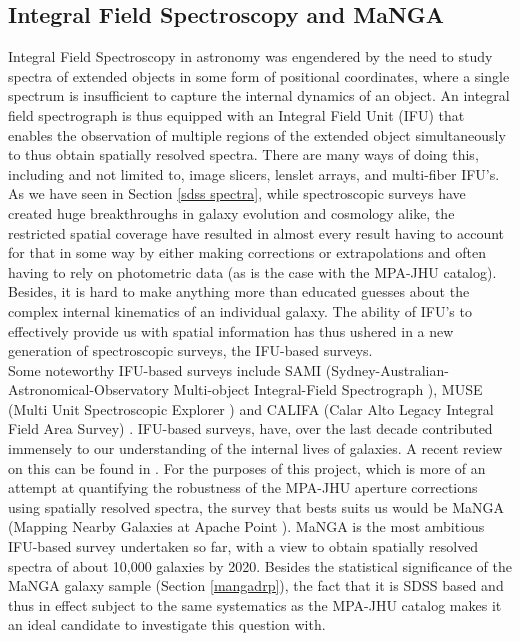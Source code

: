\subsection{Integral Field Spectroscopy and MaNGA}

Integral Field Spectroscopy in astronomy was engendered by the need to study spectra of extended objects in some form of positional coordinates, where a single spectrum is insufficient to capture the internal dynamics of an object. An integral field spectrograph is thus equipped with an Integral Field Unit (IFU) that enables the observation of multiple regions of the extended object simultaneously to thus obtain spatially resolved spectra. There are many ways of doing this, including and not limited to, image slicers, lenslet arrays, and multi-fiber IFU's. As we have seen in Section \ref{sdss spectra}, while spectroscopic surveys have created huge breakthroughs in galaxy evolution and cosmology alike, the restricted spatial coverage have resulted in almost every result having to account for that in some way by either making corrections or extrapolations and often having to rely on photometric data (as is the case with the MPA-JHU catalog). Besides, it is hard to make anything more than educated guesses about the complex internal kinematics of an individual galaxy. The ability of IFU's to effectively provide us with spatial information has thus ushered in a new generation of spectroscopic surveys, the IFU-based surveys.\\

Some noteworthy IFU-based surveys include SAMI (Sydney-Australian-Astronomical-Observatory Multi-object Integral-Field Spectrograph \citep{bryant_sami_2015, yan2016}), MUSE (Multi Unit Spectroscopic Explorer \citep{bacon_muse_2015}) and CALIFA (Calar Alto Legacy Integral Field Area Survey) \citep{sanchez_califa_2012}. IFU-based surveys, have, over the last decade contributed immensely to our understanding of the internal lives of galaxies. A recent review on this can be found in \citet{Cappellari2016}. For the purposes of this project, which is more of an attempt at quantifying the robustness of the MPA-JHU aperture corrections using spatially resolved spectra, the survey that bests suits us would be MaNGA (Mapping Nearby Galaxies at Apache Point \citep{bundy_overview_2014}). MaNGA is the most ambitious IFU-based survey undertaken so far, with a view to obtain spatially resolved spectra of about 10,000 galaxies by 2020. Besides the statistical significance of the MaNGA galaxy sample (Section \ref{mangadrp}), the fact that it is SDSS based and thus in effect subject to the same systematics as the MPA-JHU catalog makes it an ideal candidate to investigate this question with.\\

